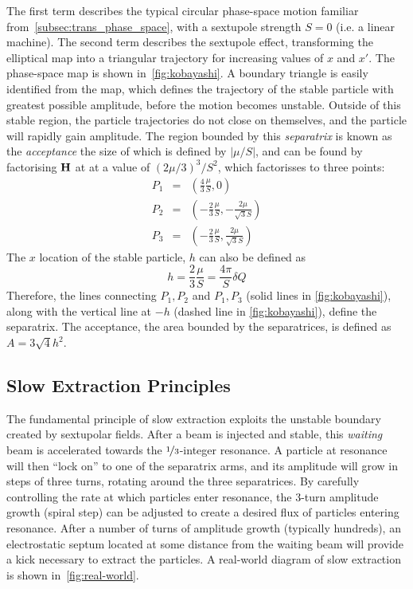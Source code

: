 \documentclass[11pt]{report}
\begin{document}
The first term describes the typical circular phase-space motion familiar from~\autoref{subsec:trans_phase_space}, with a sextupole strength $S=0$ (i.e. a linear machine). The second term describes the sextupole effect, transforming the elliptical map into a triangular trajectory for increasing values of $x$ and $x'$. The phase-space map is shown in~\autoref{fig:kobayashi}. A boundary triangle is easily identified from the map, which defines the trajectory of the stable particle with greatest possible amplitude, before the motion becomes unstable. Outside of this stable region, the particle trajectories do not close on themselves, and the particle will rapidly gain amplitude. The region bounded by this \textit{separatrix} is known as the \textit{acceptance} the size of which is defined by $|\mu /S|$, and can be found by factorising $\bf H$ at at a value of $(2\mu /3)^3/S^2$, which factorisses to three points:
\begin{eqnarray}
  P_1 &=& \left(\frac 43 \frac\mu S,    0                       \right) \\
  P_2 &=& \left(-\frac 23 \frac \mu S,  -\frac{2\mu}{\sqrt 3 S} \right) \\
  P_3 &=& \left(-\frac 23 \frac \mu S,  \frac{2\mu}{\sqrt 3 S} \right)
\end{eqnarray}
The $x$ location of the stable particle, $h$ can also be defined as
\begin{equation}
  h=\frac 23 \frac \mu S = \frac{4\pi}S\delta Q
  \label{eq:apothem}
\end{equation}
Therefore, the lines connecting $P_1, P_2$ and $P_1, P_3$ (solid lines in \autoref{fig:kobayashi}), along with the vertical line at $-h$ (dashed line in \autoref{fig:kobayashi}), define the separatrix. The acceptance, the area bounded by the separatrices, is defined as $A=3\sqrt 4 h^2$.

\subsection{Slow Extraction Principles}
The fundamental principle of slow extraction exploits the unstable boundary created by sextupolar fields. After a beam is injected and stable, this \textit{waiting} beam is accelerated towards the $\nicefrac 13$-integer resonance. A particle at resonance will then ``lock on'' to one of the separatrix arms, and its amplitude will grow in steps of three turns, rotating around the three separatrices. By carefully controlling the rate at which particles enter resonance, the 3-turn amplitude growth (spiral step) can be adjusted to create a desired flux of particles entering resonance. After a number of turns of amplitude growth (typically hundreds), an electrostatic septum located at some distance from the waiting beam will provide a kick necessary to extract the particles. A real-world diagram of slow extraction is shown in~\autoref{fig:real-world}.
\end{document}
